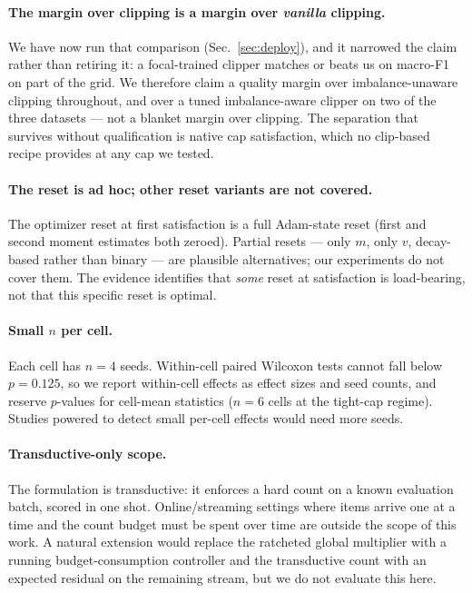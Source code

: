 \documentclass[10pt]{article}
\begin{document}
{\color{blue}
\paragraph{The margin over clipping is a margin over \emph{vanilla} clipping.}
We have now run that comparison (Sec.~\ref{sec:deploy}), and it narrowed the claim
rather than retiring it: a focal-trained clipper matches or beats us on macro-F1 on
part of the grid. We therefore claim a quality margin over imbalance-unaware
clipping throughout, and over a tuned imbalance-aware clipper on two of the three
datasets --- not a blanket margin over clipping. The separation that survives
without qualification is native cap satisfaction, which no clip-based recipe
provides at any cap we tested.}

\paragraph{The reset is ad hoc; other reset variants are not covered.}
The optimizer reset at first satisfaction is a full Adam-state reset
(first and second moment estimates both zeroed). Partial resets --- only
$m$, only $v$, decay-based rather than binary --- are plausible
alternatives; our experiments do not cover them. The evidence identifies
that \emph{some} reset at satisfaction is load-bearing, not that this
specific reset is optimal.

\paragraph{Small $n$ per cell.}
Each cell has $n{=}4$ seeds. Within-cell paired Wilcoxon tests cannot
fall below $p{=}0.125$, so we report within-cell effects as effect sizes
and seed counts, and reserve $p$-values for cell-mean statistics ($n{=}6$
cells at the tight-cap regime). Studies powered to detect small
per-cell effects would need more seeds.

\paragraph{Transductive-only scope.}
The formulation is transductive: it enforces a hard count on a known
evaluation batch, scored in one shot. Online/streaming settings where
items arrive one at a time and the count budget must be spent over time
are outside the scope of this work. A natural extension would replace
the ratcheted global multiplier with a running budget-consumption
controller and the transductive count with an expected residual on the
remaining stream, but we do not evaluate this here.
\end{document}
